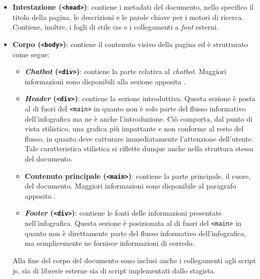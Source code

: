 \begin{itemize}
    \item \textbf{Intestazione (\texttt{<head>})}: contiene i metadati del documento, nello specifico il titolo della pagina, le descrizioni e le parole chiave per i motori di ricerca. Contiene, inoltre, i fogli di stile \gls{css} e 
    i collegamenti a \emph{font} esterni. 
    \item \textbf{Corpo (\texttt{<body>})}: contiene il contenuto visivo della pagina ed è strutturato come segue:
        \begin{itemize}
            \item \textbf{\emph{Chatbot} (\texttt{<div>})}: contiene la parte relativa al \emph{chatbot}. Maggiori informazioni sono disponibili alla sezione apposita .
            \item \textbf{\emph{Header} (\texttt{<div>})}: contiene la sezione introduttiva. Questa sezione è posta al di fuori del \texttt{<main>} in quanto non è solo parte del flusso informativo dell'infografica ma ne è anche l'introduzione.
            Ciò comporta, dal punto di vista stilistico, una grafica più impattante e non conforme al resto del flusso, in quanto deve catturare immediatamente l'attenzione dell'utente. Tale caratteristica stilistica si riflette dunque anche nella 
            struttura stessa del documento.
            \item \textbf{Contenuto principale (\texttt{<main>})}: contiene la parte principale, il cuore, del documento. Maggiori informazioni sono disponibile al paragrafo apposito .
            \item \textbf{\emph{Footer} (\texttt{<div>})}: contiene le fonti delle informazioni presentate nell'infografica. Questa sezione è posizionata al di fuori del \texttt{<main>} in quanto non è direttamente parte del flusso informativo 
            dell'infografica, ma semplicemente ne fornisce informazioni di corredo.
        \end{itemize}
    Alla fine del corpo del documento sono inclusi anche i collegamenti agli script \gls{js}, sia di librerie esterne sia di script implementati dallo stagista.
\end{itemize}


